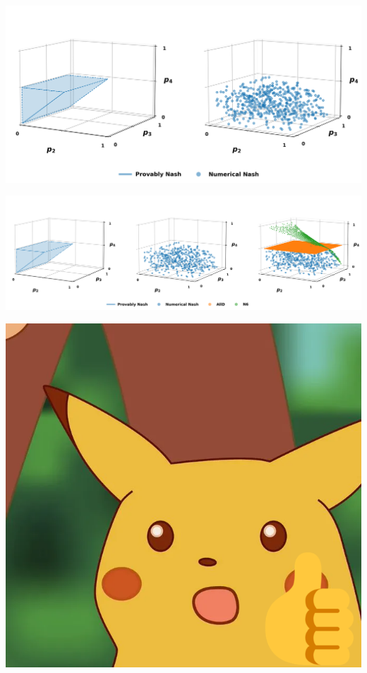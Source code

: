 \documentclass{beamer}
\begin{document}
\begin{frame}
    \begin{center}
        \includegraphics[width=\textwidth]{static/three}
    \end{center}
\end{frame}

\begin{frame}
    \begin{center}
        \includegraphics[width=\textwidth]{static/four}
    \end{center}
\end{frame}

\begin{frame}
    \begin{center}
        
    \end{center}
\end{frame}

\begin{frame}
    \begin{center}
        \includegraphics[width=.65\textwidth]{static/Ideas_Surprised_Pikachu_HD copy}
    \end{center}
\end{frame}
\end{document}
